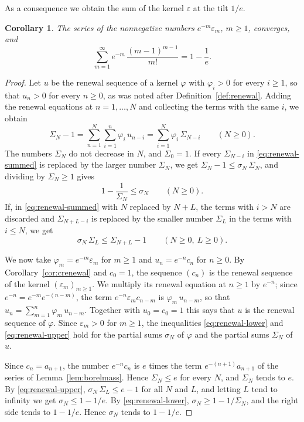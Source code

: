 \documentclass{amsart}
\newtheorem{corollary}[theorem]{Corollary}
\theoremstyle{definition}
\theoremstyle{remark}
\numberwithin{equation}{section}
\begin{document}
As a consequence we obtain the sum of the kernel $\varepsilon$ at the tilt
$1/e$.

\begin{corollary}\label{cor:kernelmass}
The series of the nonnegative numbers $e^{-m}\varepsilon_m$, $m\ge1$,
converges, and
\[
\sum_{m=1}^{\infty}e^{-m}\,\frac{(m-1)^{m-1}}{m!}=1-\frac1e .
\]
\end{corollary}

\begin{proof}
Let $u$ be the renewal sequence of a kernel $\varphi$ with $\varphi_i>0$
for every $i\ge1$, so that $u_n>0$ for every $n\ge0$, as was noted after
Definition~\ref{def:renewal}. Adding the renewal equations at
$n=1,\dots,N$ and collecting the terms with the same $i$, we obtain
\begin{equation}\label{eq:renewal-summed}
\Sigma_N-1=\sum_{n=1}^{N}\sum_{i=1}^{n}\varphi_i\,u_{n-i}
=\sum_{i=1}^{N}\varphi_i\,\Sigma_{N-i}\qquad(N\ge0).
\end{equation}
The numbers $\Sigma_N$ do not decrease in $N$, and $\Sigma_0=1$. If every
$\Sigma_{N-i}$ in \eqref{eq:renewal-summed} is replaced by the larger number
$\Sigma_N$, we get $\Sigma_N-1\le\sigma_N\,\Sigma_N$, and dividing by
$\Sigma_N\ge1$ gives
\begin{equation}\label{eq:renewal-lower}
1-\frac{1}{\Sigma_N}\le\sigma_N\qquad(N\ge0).
\end{equation}
If, in \eqref{eq:renewal-summed} with $N$ replaced by $N+L$, the terms with
$i>N$ are discarded and $\Sigma_{N+L-i}$ is replaced by the smaller number
$\Sigma_L$ in the terms with $i\le N$, we get
\begin{equation}\label{eq:renewal-upper}
\sigma_N\,\Sigma_L\le\Sigma_{N+L}-1\qquad(N\ge0,\ L\ge0).
\end{equation}

We now take $\varphi_m=e^{-m}\varepsilon_m$ for $m\ge1$ and
$u_n=e^{-n}c_n$ for $n\ge0$. By Corollary~\ref{cor:crenewal} and $c_0=1$,
the sequence $(c_n)$ is the renewal sequence of the kernel
$(\varepsilon_m)_{m\ge1}$. We multiply its renewal equation at $n\ge1$ by
$e^{-n}$; since $e^{-n}=e^{-m}e^{-(n-m)}$, the term
$e^{-n}\varepsilon_mc_{n-m}$ is $\varphi_m\,u_{n-m}$, so that
$u_n=\sum_{m=1}^{n}\varphi_m\,u_{n-m}$. Together with $u_0=c_0=1$ this says
that $u$ is the renewal sequence of $\varphi$. Since $\varepsilon_m>0$ for
$m\ge1$, the inequalities \eqref{eq:renewal-lower} and
\eqref{eq:renewal-upper} hold for the partial sums $\sigma_N$ of $\varphi$
and the partial sums $\Sigma_N$ of $u$.

Since $c_n=a_{n+1}$, the number $e^{-n}c_n$ is $e$ times the term
$e^{-(n+1)}a_{n+1}$ of the series of Lemma~\ref{lem:borelmass}. Hence
$\Sigma_N\le e$ for every $N$, and $\Sigma_N$ tends to $e$. By
\eqref{eq:renewal-upper}, $\sigma_N\,\Sigma_L\le e-1$ for all $N$ and $L$,
and letting $L$ tend to infinity we get $\sigma_N\le1-1/e$. By
\eqref{eq:renewal-lower},
$\sigma_N\ge1-1/\Sigma_N$, and the right side tends to $1-1/e$. Hence
$\sigma_N$ tends to $1-1/e$.
\end{proof}
\end{document}
